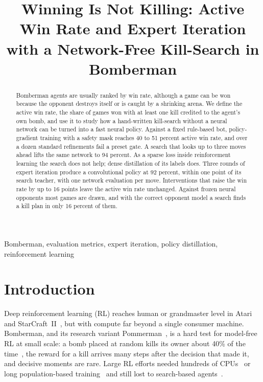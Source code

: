\documentclass[conference]{IEEEtran}
\begin{document}
\title{Winning Is Not Killing: Active Win Rate and Expert Iteration with a Network-Free Kill-Search in Bomberman}

\author{
}

\maketitle

\begin{abstract}
Bomberman agents are usually ranked by win rate, although a game can be won because the opponent destroys itself or is caught by a shrinking arena. We define the active win rate, the share of games won with at least one kill credited to the agent's own bomb, and use it to study how a hand-written kill-search without a neural network can be turned into a fast neural policy. Against a fixed rule-based bot, policy-gradient training with a safety mask reaches 40 to 51 percent active win rate, and over a dozen standard refinements fail a preset gate. A search that looks up to three moves ahead lifts the same network to 94 percent. As a sparse loss inside reinforcement learning the search does not help; dense distillation of its labels does. Three rounds of expert iteration produce a convolutional policy at 92 percent, within one point of its search teacher, with one network evaluation per move. Interventions that raise the win rate by up to 16 points leave the active win rate unchanged. Against frozen neural opponents most games are drawn, and with the correct opponent model a search finds a kill plan in only 16 percent of them.
\end{abstract}

\begin{IEEEkeywords}
Bomberman, evaluation metrics, expert iteration, policy distillation, reinforcement learning
\end{IEEEkeywords}

\section{Introduction}

Deep reinforcement learning (RL) reaches human or grandmaster level in Atari and StarCraft~II~\cite{mnih2015dqn,vinyals2019alphastar}, but with compute far beyond a single consumer machine. Bomberman, and its research variant Pommerman~\cite{resnick2018pommerman}, is a hard test for model-free RL at small scale: a bomb placed at random kills its owner about 40\% of the time~\cite{gao2019hard}, the reward for a kill arrives many steps after the decision that made it, and decisive moments are rare. Large RL efforts needed hundreds of CPUs~\cite{peng2018continual} or long population-based training~\cite{huynh2024} and still lost to search-based agents~\cite{osogami2019,huynh2024}.
\end{document}
